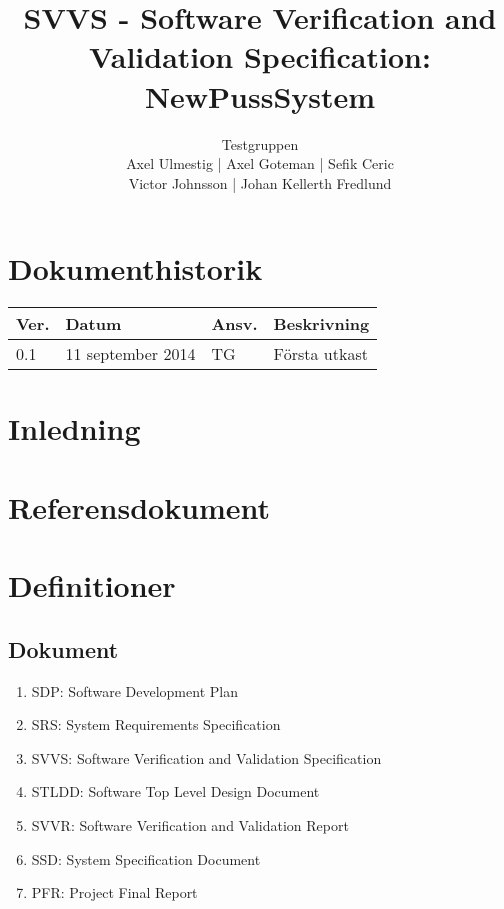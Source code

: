 \documentclass[a4paper]{article}
\title{SVVS - Software Verification and Validation Specification: NewPussSystem}
\author{Testgruppen \\ Axel Ulmestig | Axel Goteman | Sefik Ceric \\ Victor Johnsson | Johan Kellerth Fredlund}
\date{}
\begin{document}
\maketitle
\thispagestyle{fancy}
\tableofcontents
\newpage

\section*{Dokumenthistorik}

\begin{tabular}{ l l l p{9cm} }
Ver. & Datum & Ansv. & Beskrivning \\\hline
0.1 & 11 september 2014 & TG & Första utkast \\
\end{tabular}
\section{Inledning}       

\section{Referensdokument}

\section{Definitioner}

\subsection{Dokument}

\begin{enumerate}

\item SDP: Software Development Plan

\item SRS: System Requirements Specification

\item SVVS: Software Verification and Validation Specification

\item STLDD: Software Top Level Design Document

\item SVVR: Software Verification and Validation Report

\item SSD: System Specification Document

\item PFR: Project Final Report


\end{enumerate}
\end{document}
